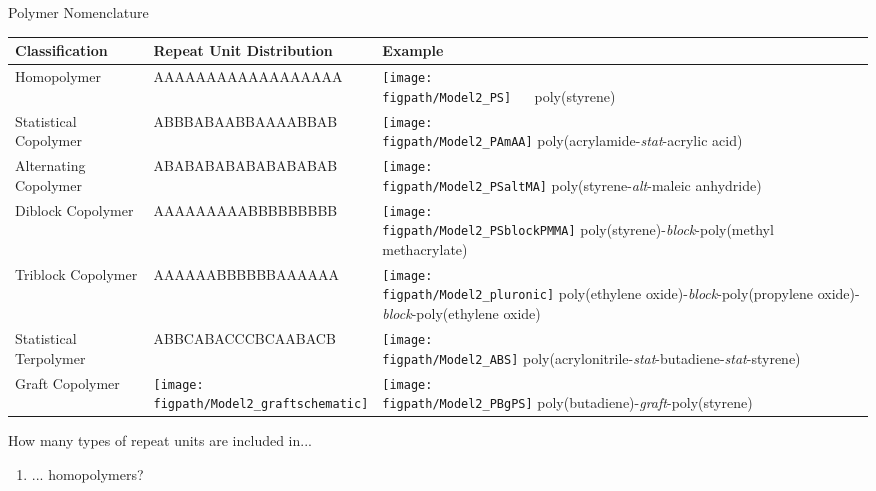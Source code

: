 \begin{activity}{Polymer Nomenclature}
\begin{model}[Composition]
	{\renewcommand{\arraystretch}{1.75}
	\begin{tabular}{m{0.78in}m{2in}m{2.5in}}
		\hline
		Classification & Repeat Unit Distribution & Example\\
		\hline
		Homopolymer & AAAAAAAAAAAAAAAAAA & \texttt{[image: \\figpath/Model2\_PS]} ~~ poly(styrene) \\\hline
		Statistical Copolymer & ABBBABAABBAAAABBAB & \texttt{[image: \\figpath/Model2\_PAmAA]} \newline poly(acrylamide-\emph{stat}-acrylic acid)\\\hline
		Alternating Copolymer & ABABABABABABABABAB & \texttt{[image: \\figpath/Model2\_PSaltMA]} \newline poly(styrene-\emph{alt}-maleic anhydride)\\\hline
		Diblock Copolymer & AAAAAAAAABBBBBBBBB & \texttt{[image: \\figpath/Model2\_PSblockPMMA]} \newline poly(styrene)-\emph{block}-poly(methyl methacrylate)\\\hline
		Triblock Copolymer & AAAAAABBBBBBAAAAAA & \texttt{[image: \\figpath/Model2\_pluronic]} \newline poly(ethylene oxide)-\emph{block}-poly(propyl\-ene oxide)-\emph{block}-poly(ethylene oxide) \\\hline
		Statistical Terpolymer & ABBCABACCCBCAABACB & \texttt{[image: \\figpath/Model2\_ABS]} \newline poly(acrylonitrile-\emph{stat}-butadiene-\emph{stat}-styrene) \\\hline
		Graft Copolymer & \texttt{[image: \\figpath/Model2\_graftschematic]} & \texttt{[image: \\figpath/Model2\_PBgPS]} \newline poly(butadiene)-\emph{graft}-poly(styrene) 
	\end{tabular}
	}

\end{model}

\begin{ctqs}

	\question How many types of repeat units are included in...
	
		\begin{enumerate}
			\item ... homopolymers?
			
				\begin{solution}[0.25in]
				\end{solution}
			

\end{enumerate}
\end{ctqs}
\end{activity}
